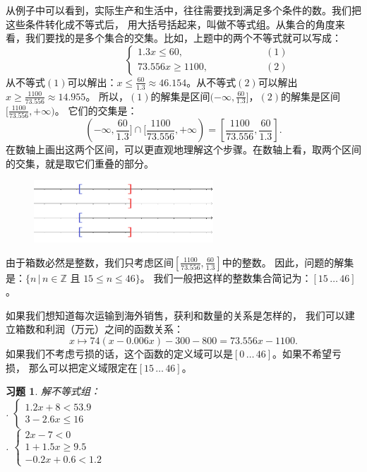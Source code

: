 \documentclass[12pt,UTF8]{ctexbook}
\newtheorem{xt}{习题}[section]
\begin{document}
从例子中可以看到，实际生产和生活中，往往需要找到满足多个条件的数。我们把这些条件转化成不等式后，
用大括号括起来，叫做不等式组。从集合的角度来看，我们要找的是多个集合的交集。比如，上题中的两个不等式就可以写成：
$$ \quad \quad \quad \quad \quad\left\{
\begin{array}{cr}
    1.3x \leqslant 60, & \quad \quad \quad \quad \quad (1) \\
    73.556x \geqslant 1100, & \quad \quad \quad \quad \quad (2)
\end{array}\right.
$$
从不等式$(1)$可以解出：$x \leqslant \frac{60}{1.3} \approx 46.154$。从不等式$(2)$可以解出$x \geqslant \frac{1100}{73.556} \approx 14.955$。
所以，$(1)$的解集是区间$(-\infty, \frac{60}{1.3}]$，$(2)$的解集是区间$[\frac{1100}{73.556}, +\infty)$。
它们的交集是：
$$(-\infty, \frac{60}{1.3}] \cap [\frac{1100}{73.556}, +\infty)  = [\frac{1100}{73.556}, \frac{60}{1.3}]. $$
在数轴上画出这两个区间，可以更直观地理解这个步骤。在数轴上看，取两个区间的交集，就是取它们重叠的部分。

\begin{figure}[H] %
    \vspace{8pt}
    \centering
    \includegraphics[width=0.6\textwidth]{tu/一元一次不等式组1.png}
\end{figure}

由于箱数必然是整数，我们只考虑区间$[\frac{1100}{73.556}, \frac{60}{1.3}]$中的整数。
因此，问题的解集是：$\{n \, | \, n \in \mathbb{Z} \mbox{ 且 }15 \leqslant n \leqslant 46\}$。
我们一般把这样的整数集合简记为：$[15 \, \ldots \, 46]$。

如果我们想知道每次运输到海外销售，获利和数量的关系是怎样的，
我们可以建立箱数和利润（万元）之间的函数关系：
$$ x \mapsto 74 (x - 0.006x) - 300 - 800 = 73.556 x - 1100. $$
如果我们不考虑亏损的话，这个函数的定义域可以是$[0 \, \ldots \, 46]$。如果不希望亏损，
那么可以把定义域限定在$[15 \, \ldots \, 46]$。

\begin{xt}\label{xt:5-5-0}
    解不等式组：\\
    . $\left\{
        \begin{array}{cr}
            1.2x + 8 < 53.9 \\
            3 - 2.6x \leqslant 16 
        \end{array}\right.$ \\
    . $\left\{
        \begin{array}{cr}
            2x - 7 < 0 \\
            1 + 1.5x \geqslant 9.5 \\
            -0.2x + 0.6 < 1.2 
        \end{array}\right.$ 
\end{xt}
\end{document}
